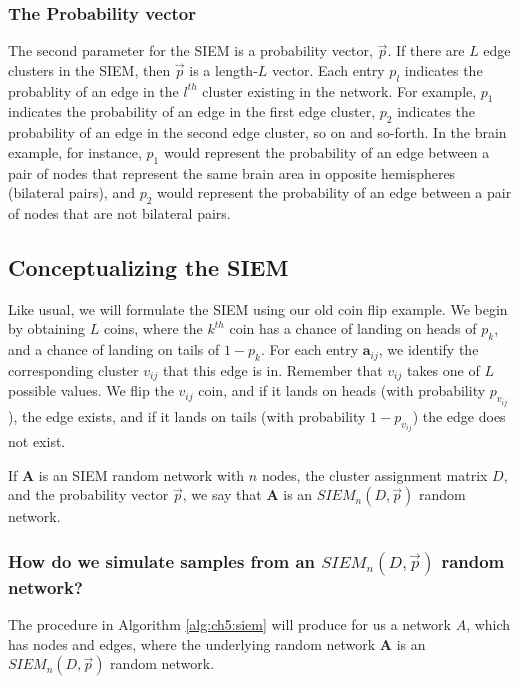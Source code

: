 \subsubsection{The Probability vector}

The second parameter for the SIEM is a probability vector, $\vec p$. If there are $L$ edge clusters in the SIEM, then $\vec p$ is a length-$L$ vector. Each entry $p_l$ indicates the probablity of an edge in the $l^{th}$ cluster existing in the network. For example, $p_1$ indicates the probability of an edge in the first edge cluster, $p_2$ indicates the probability of an edge in the second edge cluster, so on and so-forth. In the brain example, for instance, $p_1$ would represent the probability of an edge between a pair of nodes that represent the same brain area in opposite hemispheres (bilateral pairs), and $p_2$ would represent the probability of an edge between a pair of nodes that are not bilateral pairs.

\subsection{Conceptualizing the SIEM}

Like usual, we will formulate the SIEM using our old coin flip example. We begin by obtaining $L$ coins, where the $k^{th}$ coin has a chance of landing on heads of $p_k$, and a chance of landing on tails of $1 - p_k$. For each entry $\mathbf a_{ij}$, we identify the corresponding cluster $v_{ij}$ that this edge is in. Remember that $v_{ij}$ takes one of $L$ possible values. We flip the $v_{ij}$ coin, and if it lands on heads (with probability $p_{v_{ij}}$), the edge exists, and if it lands on tails (with probability $1 - p_{v_{ij}}$) the edge does not exist.

If $\mathbf A$ is an SIEM random network with $n$ nodes, the cluster assignment matrix $D$, and the probability vector $\vec p$, we say that $\mathbf A$ is an $SIEM_n(D, \vec p)$ random network.

\subsubsection{How do we simulate samples from an $SIEM_n(D, \vec p)$ random network?}

The procedure in Algorithm \ref{alg:ch5:siem} will produce for us a network $A$, which has nodes and edges, where the underlying random network $\mathbf A$ is an $SIEM_n(D, \vec p)$ random network.


